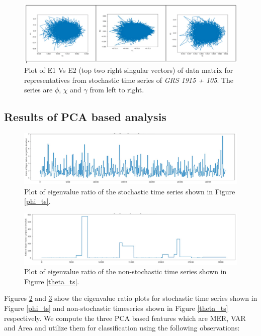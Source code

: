 \documentclass[10pt,conference]{IEEEtran}
\begin{document}
\begin{figure}[ht]
  \centering
  \includegraphics[width=\linewidth]{svd_stochastic.png}
  \caption{Plot of E1 Vs E2 (top two right singular vectors) of data matrix for  representatives from  stochastic time series  of \textit{GRS 1915 + 105}. The series are $\phi$, $\chi$ and $\gamma$ from left to right.}
  \label{svd_e1e2_stochastic}
\end{figure}


\subsection{Results of PCA based analysis}

\begin{figure}[ht]
  \centering
  \includegraphics[width=0.9\linewidth]{phi_ts_eig.png}
  \caption{Plot of eigenvalue ratio of the stochastic time series shown in Figure \ref{phi_ts}.}
  \label{phi_eig}
\end{figure}

\begin{figure}[ht]
  \centering
  \includegraphics[width=0.8\linewidth]{theta_ts_eig.png}
  \caption{Plot of eigenvalue ratio of the  non-stochastic time series shown in Figure \ref{theta_ts}. }
  \label{theta_eig}
\end{figure}

Figures \ref{phi_eig} and \ref{theta_eig} show the eigenvalue ratio plots for stochastic time series shown in Figure \ref{phi_ts} and  non-stochastic timeseries shown in Figure \ref{theta_ts} respectively. We compute the three PCA based features which are MER, VAR and Area  and utilize them for classification using the following observations:
\end{document}
